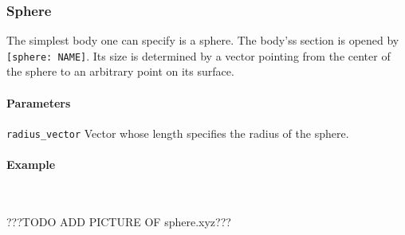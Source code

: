 \subsubsection{Sphere}
The simplest body one can specify is a sphere. The body'ss section is opened by \lstinline{[sphere: NAME]}. Its size is determined by a  vector pointing from the center of the sphere to an arbitrary point on its surface.

\paragraph{Parameters}
\begin{description}
 \item{\lstinline{radius_vector}} Vector whose length specifies the radius of the sphere.
\end{description}

\paragraph{Example}\ 

%
???TODO ADD PICTURE OF sphere.xyz???